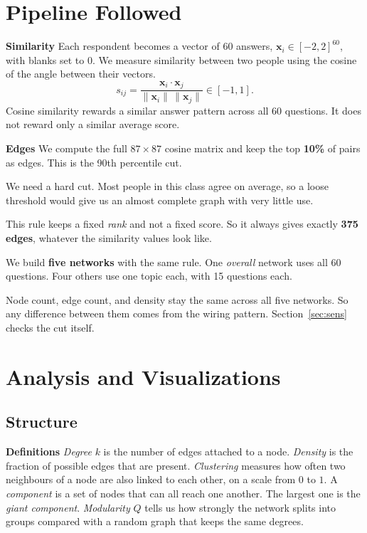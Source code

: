 \documentclass[11pt,a4paper]{article}
\newcommand{\lab}[1]{\textbf{#1}}
\begin{document}
\section{Pipeline Followed}

\lab{Similarity} Each respondent becomes a vector of 60 answers,
$\mathbf{x}_i\in[-2,2]^{60}$, with blanks set to $0$. We measure similarity
between two people using the cosine of the angle between their vectors.
\[
  s_{ij}=\frac{\mathbf{x}_i\cdot\mathbf{x}_j}
  {\lVert\mathbf{x}_i\rVert\,\lVert\mathbf{x}_j\rVert}\in[-1,1].
\]
Cosine similarity rewards a similar answer pattern across all 60 questions. It
does not reward only a similar average score.

\lab{Edges} We compute the full $87\times87$ cosine matrix and keep the top
\textbf{10\%} of pairs as edges. This is the 90th percentile cut.
\begin{dash}
  \item We need a hard cut. Most people in this class agree on average, so a
  loose threshold would give us an almost complete graph with very little use.
  \item This rule keeps a fixed \emph{rank} and not a fixed score. So it always
  gives exactly \textbf{375 edges}, whatever the similarity values look like.
  \item We build \textbf{five networks} with the same rule. One \emph{overall}
  network uses all 60 questions. Four others use one topic each, with 15
  questions each.
  \item Node count, edge count, and density stay the same across all five
  networks. So any difference between them comes from the wiring pattern.
  Section~\ref{sec:sens} checks the cut itself.
\end{dash}

\section{Analysis and Visualizations}
\label{sec:analysis}

\subsection{Structure}

\lab{Definitions} \emph{Degree} $k$ is the number of edges attached to a node.
\emph{Density} is the fraction of possible edges that are present.
\emph{Clustering} measures how often two neighbours of a node are also linked
to each other, on a scale from $0$ to $1$. A \emph{component} is a set of nodes
that can all reach one another. The largest one is the \emph{giant component}.
\emph{Modularity} $Q$ tells us how strongly the network splits into groups
compared with a random graph that keeps the same degrees.
\end{document}
